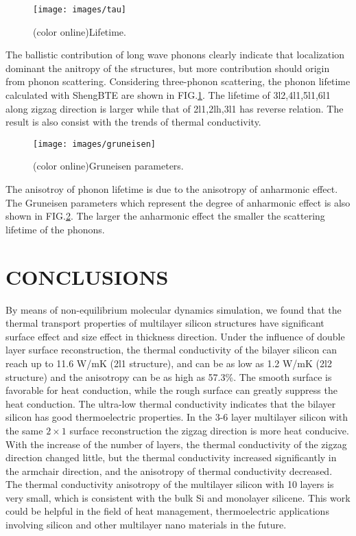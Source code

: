 \documentclass[%
 reprint,
 amsmath,amssymb,
 aps,
 prb,
]{revtex4-1}
\begin{document}
\begin{figure}[b]
  \texttt{[image: images/tau]}
  \caption{\label{fig:tau} (color online)Lifetime.}
\end{figure}

The ballistic contribution of long wave phonons clearly indicate that localization dominant the anitropy of the structures, but more contribution should origin from phonon scattering. Considering three-phonon scattering, the phonon lifetime calculated with ShengBTE\cite{Li2014} are shown in FIG.\ref{fig:tau}. The lifetime of 3l2,4l1,5l1,6l1 along zigzag direction is larger while that of 2l1,2lh,3l1 has reverse relation. The result is also consist with the trends of thermal conductivity.

\begin{figure}[b]
  \texttt{[image: images/gruneisen]}
  \caption{\label{fig:gruneisen} (color online)Gruneisen parameters.}
\end{figure}

The anisotroy of phonon lifetime is due to the anisotropy of anharmonic effect. The Gruneisen parameters which represent the degree of anharmonic effect is also shown in FIG.\ref{fig:gruneisen}.
The larger the anharmonic effect the smaller the scattering lifetime of the phonons.



\section{CONCLUSIONS}

By means of non-equilibrium molecular dynamics simulation, we found that the thermal transport properties of multilayer silicon structures have significant surface effect and size effect in thickness direction. Under the influence of double layer surface reconstruction, the thermal conductivity of the bilayer silicon can reach up to 11.6 W/mK (2l1 structure), and can be as low as 1.2 W/mK (2l2 structure) and the anisotropy can be as high as 57.3\%. The smooth surface is favorable for heat conduction, while the rough surface can greatly suppress the heat conduction. The ultra-low thermal conductivity indicates that the bilayer silicon has good thermoelectric properties. In the 3-6 layer multilayer silicon with the same $2 \times 1$ surface reconstruction the zigzag direction is more heat conducive. With the increase of the number of layers, the thermal conductivity of the zigzag direction changed little, but the thermal conductivity increased significantly in the armchair direction, and the anisotropy of thermal conductivity decreased. The thermal conductivity anisotropy of the multilayer silicon with 10 layers is very small, which is consistent with the bulk Si and monolayer silicene. This work could be helpful in the field of heat management, thermoelectric applications involving silicon and other multilayer nano materials in the future.
\end{document}

